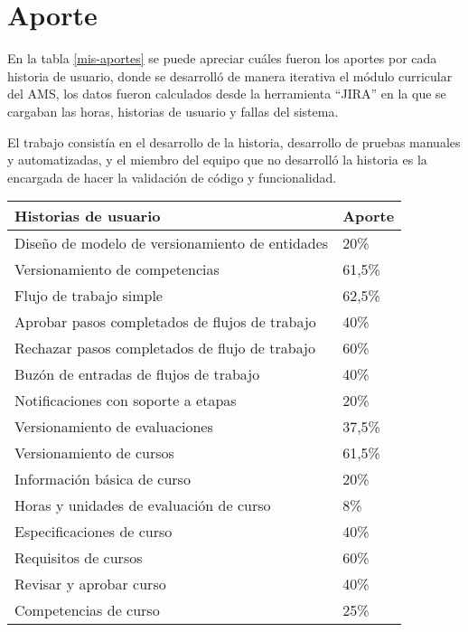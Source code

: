 \section{Aporte}
En la tabla \ref{mis-aportes} se puede apreciar cuáles fueron los aportes por cada historia de usuario, donde se desarrolló de manera iterativa el módulo curricular del AMS, los datos fueron calculados desde la herramienta \enquote{JIRA} en la que se cargaban las horas, historias de usuario y fallas del sistema.

El trabajo consistía en el desarrollo de la historia, desarrollo de pruebas manuales y automatizadas, y el miembro del equipo que no desarrolló la historia es la encargada de hacer la validación de código y funcionalidad.

\begin{table}[H]
\centering
\begin{tabular}{@{}ll@{}}
\toprule
Historias de usuario                                & Aporte \\ \midrule
Diseño de modelo de versionamiento de entidades     &  20\%  \\
Versionamiento de competencias                      & 61,5\% \\
Flujo de trabajo simple                             & 62,5\% \\
Aprobar pasos completados de flujos de trabajo      &  40\%  \\
Rechazar pasos completados de flujo de trabajo      &  60\%  \\
Buzón de entradas de flujos de trabajo              &  40\%  \\
Notificaciones con soporte a etapas                 &  20\%  \\
Versionamiento de evaluaciones                      & 37,5\% \\
Versionamiento de cursos                            & 61,5\% \\
Información básica de curso                         &  20\%  \\
Horas y unidades de evaluación de curso             &   8\%  \\
Especificaciones de curso                           &  40\%  \\
Requisitos de cursos                                &  60\%  \\
Revisar y aprobar curso                             &  40\%  \\
Competencias de curso                               &  25\%  \\

\end{tabular}
\end{table}
